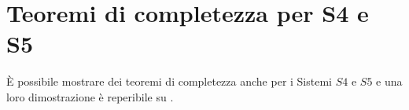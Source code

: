 \documentclass[a4paper, titlepage, 12pt]{report}
\newtheorem{lemma}{Lemma}[chapter]
\newenvironment{proof}
    {\textit{Dim.}
    }
    {\begin{flushright}$\bullet$\end{flushright}
    }
\begin{document}
\section{Teoremi di completezza per S4 e S5}
È possibile mostrare dei teoremi di completezza anche per i Sistemi $S4$ e $S5$
e una loro dimostrazione è reperibile su \cite{IntroModale}.











\end{document}
